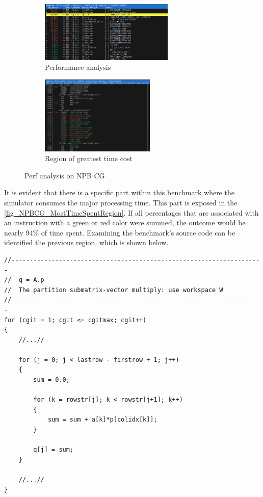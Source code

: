 \begin{figure}[H]
    \begin{subfigure}{\textwidth}
        \centering
        \includegraphics[width=0.7\textwidth]{Images/NPBCG_CycleAnalysis.png}
        \caption{ Performance analysis}
        \label{fig_NPBCG_CycleAnalysis}
    \end{subfigure}
    \begin{subfigure}{\textwidth}
        \centering
        \includegraphics[width=0.6\textwidth]{Images/NPBCG_MostTimeSpentRegion.png}
        \caption{ Region of greatest time cost}
        \label{fig_NPBCG_MostTimeSpentRegion}
    \end{subfigure}
    \caption{Perf analysis on NPB CG}
\end{figure}

It is evident that there is a specific part within this benchmark where the simulator consumes the major processing time. This part is 
exposed in the \autoref{fig_NPBCG_MostTimeSpentRegion}. If all percentages that are associated with an instruction with a green or red color 
were summed, the outcome would be nearly 94\% of time spent. Examining the benchmark's source code can be identified the previous region, which is 
shown below. 


\begin{lstlisting}[style=customC, caption={Snippet source code of NPB CG}, label=CodeNpbCgSnippet]
//---------------------------------------------------------------------
//  q = A.p
//  The partition submatrix-vector multiply: use workspace W
//---------------------------------------------------------------------
for (cgit = 1; cgit <= cgitmax; cgit++) 
{
    //...//

    for (j = 0; j < lastrow - firstrow + 1; j++) 
    {
        sum = 0.0;

        for (k = rowstr[j]; k < rowstr[j+1]; k++) 
        {
            sum = sum + a[k]*p[colidx[k]];
        }

        q[j] = sum;
    }

    //...//
}
\end{lstlisting}

